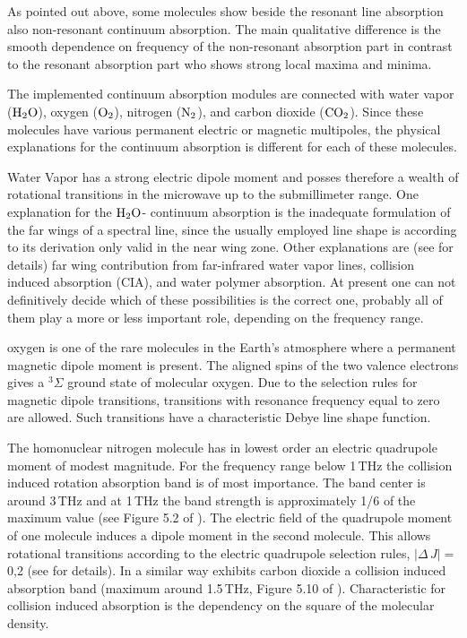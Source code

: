 {%

\label{levelb:ContAbs}

As pointed out above, some molecules show beside the resonant line
absorption also non-resonant continuum absorption. The main qualitative
difference is the smooth dependence on frequency of the non-resonant
absorption part in contrast to the resonant absorption part who shows 
strong local maxima and minima.

The implemented continuum absorption modules are connected with water
vapor ($\mbox{H}_2\mbox{O}$), oxygen ($\mbox{O}_2$), nitrogen ($\mbox{N}_2$), and carbon dioxide
($\mbox{CO}_2$). Since these molecules have various permanent electric or magnetic
multipoles, the physical explanations for the continuum absorption is 
different for each of these molecules.

Water Vapor has a strong electric dipole moment and posses therefore a 
wealth of rotational transitions in the microwave up to the submillimeter 
range. One explanation for the $\mbox{H}_2\mbox{O}$- continuum absorption is the inadequate 
formulation of the far wings of a spectral line, since the usually employed 
\citet{vanvleck:45} line shape is according to its derivation only valid 
in the near wing zone. Other explanations are (see \cite{pwr:93} for details) 
far wing contribution from far-infrared water vapor lines, collision induced 
absorption (CIA), and water polymer absorption. At present one can not definitively 
decide which of these possibilities is the correct one, probably all of them 
play a more or less important role, depending on the frequency range.

oxygen is one of the rare molecules in the Earth's atmosphere where a permanent 
magnetic dipole moment is present. The aligned spins of the two valence electrons 
gives a $^{3}\Sigma$ ground state of molecular oxygen. 
Due to the selection rules for magnetic dipole transitions, transitions with 
resonance frequency equal to zero are allowed. Such transitions have a characteristic 
Debye line shape function.

The homonuclear nitrogen molecule has in lowest order an electric quadrupole moment 
of modest magnitude.
For the frequency range below 1\,THz the collision induced rotation absorption 
band \cite{goodyandyung:89} is of most importance. The band center is around 3\,THz and 
at 1\,THz the band strength is approximately 1/6 of the maximum value (see 
Figure 5.2 of \cite{goodyandyung:89}). The electric field of the quadrupole 
moment of one molecule induces a dipole moment in the second molecule. This allows 
rotational transitions according to the electric quadrupole selection rules, 
$|\Delta\,J|=$0,2 (see \cite{pwr:93} for details). In a similar way exhibits 
carbon dioxide a collision induced absorption band (maximum around 1.5\,THz, 
Figure 5.10 of \cite{goodyandyung:89}). Characteristic for collision induced 
absorption is the dependency on the square of the molecular density.



}
